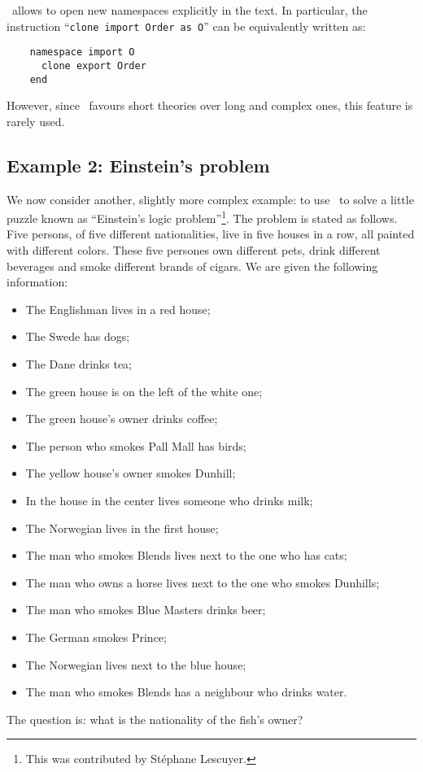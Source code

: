 \why\ allows to open new namespaces explicitly in the text. In particular,
the instruction ``\texttt{clone import Order as O}'' can be equivalently
written as:
\begin{verbatim}
    namespace import O
      clone export Order
    end
\end{verbatim}
However, since \why\ favours short theories over long and complex ones,
this feature is rarely used.

\subsection{Example 2: Einstein's problem}

We now consider another, slightly more complex example: to use \why\
to solve a little puzzle known as ``Einstein's logic
problem''\footnote{This was contributed by St\'ephane Lescuyer.}.
The problem is stated as follows. Five persons, of five
different nationalities, live in five houses in a row, all
painted with different colors.
These five persones own different pets, drink different beverages and
smoke different brands of cigars.
We are given the following information:
\begin{itemize}
\item The Englishman lives in a red house;

\item The Swede has dogs;

\item The Dane drinks tea;

\item The green house is on the left of the white one;

\item The green house's owner drinks coffee;

\item The person who smokes Pall Mall has birds;

\item The yellow house's owner smokes Dunhill;

\item In the house in the center lives someone who drinks milk;

\item The Norwegian lives in the first house;

\item The man who smokes Blends lives next to the one who has cats;

\item The man who owns a horse lives next to the one who smokes Dunhills;

\item The man who smokes Blue Masters drinks beer;

\item The German smokes Prince;

\item The Norwegian lives next to the blue house;

\item The man who smokes Blends has a neighbour who drinks water.
\end{itemize}
The question is: what is the nationality of the fish's owner?

